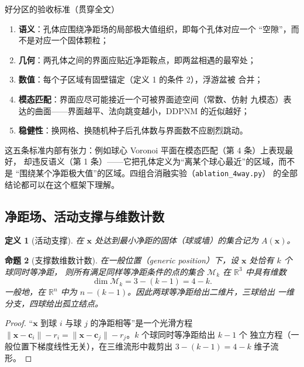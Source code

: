 \documentclass[UTF8,zihao=-4]{ctexart}
\newcommand{\R}{\mathbb{R}}
\newcommand{\cc}{\bm c}
\newtheorem{definition}{定义}[section]
\newtheorem{proposition}[definition]{命题}
\begin{document}
\begin{keybox}{好分区的验收标准（贯穿全文）}
\begin{enumerate}
  \item \textbf{语义}：孔体应围绕净距场的局部极大值组织，即每个孔体对应一个
  ``空隙''，而不是对应一个固体颗粒；
  \item \textbf{几何}：两孔体之间的界面应贴近净距鞍点，即两盆相遇的最窄处；
  \item \textbf{数值}：每个子区域有固壁锚定（定义 1 的条件 2），浮游盆被
  合并；
  \item \textbf{模态匹配}：界面应尽可能接近一个可被界面迹空间（常数、仿射
  九模态）表达的曲面——界面越平、法向跳变越小，DDPNM 的近似越好；
  \item \textbf{稳健性}：换网格、换随机种子后孔体数与界面数不应剧烈跳动。
\end{enumerate}
\end{keybox}

这五条标准内部有张力：例如球心 Voronoi 平面在模态匹配（第 4 条）上表现最好，
却违反语义（第 1 条）——它把孔体定义为``离某个球心最近''的区域，而不是
``围绕某个净距极大值''的区域。四组合消融实验（\texttt{ablation\_4way.py}）
的全部结论都可以在这个框架下理解。

\subsection{净距场、活动支撑与维数计数}

\begin{definition}[活动支撑]
  在 $\bm x$ 处达到最小净距的固体（球或墙）的集合记为 $A(\bm x)$。
\end{definition}

\begin{proposition}[支撑数维数计数]
  在一般位置（generic position）下，设 $\bm x$ 处恰有 $k$ 个球同时等净距，
  则所有满足同样等净距条件的点的集合 $\mathcal M_k$ 在 $\R^3$ 中具有维数
  \begin{equation}\label{eq:dim-count}
    \dim\mathcal M_k=3-(k-1)=4-k.
  \end{equation}
  一般地，在 $\R^n$ 中为 $n-(k-1)$。因此两球等净距给出二维片，三球给出
  一维分支，四球给出孤立结点。
\end{proposition}

\begin{proof}
  ``$\bm x$ 到球 $i$ 与球 $j$ 的净距相等''是一个光滑方程
  $\|\bm x-\cc_i\|-r_i=\|\bm x-\cc_j\|-r_j$。$k$ 个球同时等净距给出 $k-1$ 个
  独立方程（一般位置下梯度线性无关），在三维流形中裁剪出
  $3-(k-1)=4-k$ 维子流形。
\end{proof}
\end{document}
